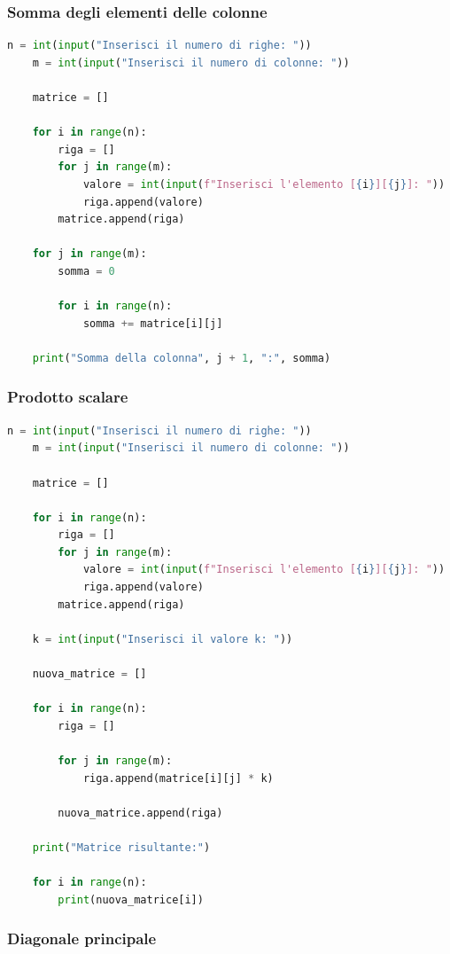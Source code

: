 \documentclass[a4paper,12pt]{article}
\begin{document}
\newpage

\subsubsection{Somma degli elementi delle colonne}

\begin{lstlisting}[language=Python]
	n = int(input("Inserisci il numero di righe: "))
	m = int(input("Inserisci il numero di colonne: "))
	
	matrice = []
	
	for i in range(n):
		riga = []
		for j in range(m):
			valore = int(input(f"Inserisci l'elemento [{i}][{j}]: "))
			riga.append(valore)
		matrice.append(riga)
	
	for j in range(m):
		somma = 0
	
		for i in range(n):
			somma += matrice[i][j]
	
	print("Somma della colonna", j + 1, ":", somma)
\end{lstlisting}

\newpage

\subsubsection{Prodotto scalare}

\begin{lstlisting}[language=Python]
	n = int(input("Inserisci il numero di righe: "))
	m = int(input("Inserisci il numero di colonne: "))
	
	matrice = []
	
	for i in range(n):
		riga = []
		for j in range(m):
			valore = int(input(f"Inserisci l'elemento [{i}][{j}]: "))
			riga.append(valore)
		matrice.append(riga)
	
	k = int(input("Inserisci il valore k: "))
	
	nuova_matrice = []
	
	for i in range(n):
		riga = []
	
		for j in range(m):
			riga.append(matrice[i][j] * k)
	
		nuova_matrice.append(riga)
	
	print("Matrice risultante:")
	
	for i in range(n):
		print(nuova_matrice[i])
\end{lstlisting}

\newpage

\subsubsection{Diagonale principale}
\end{document}
